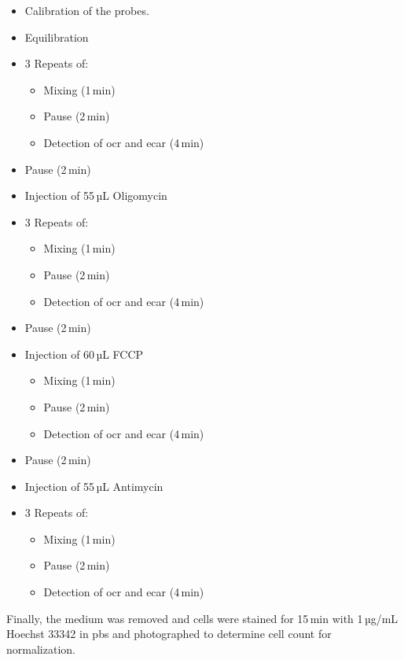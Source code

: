     \begin{itemize}
        \item Calibration of the probes.
        \item Equilibration
        \item 3 Repeats of:
        \begin{itemize}
            \item Mixing (1\,min)
            \item Pause (2\,min)
            \item Detection of \ac{ocr} and \ac{ecar} (4\,min)
        \end{itemize}
        \item Pause (2\,min)
        \item Injection of 55\,µL Oligomycin
        \item 3 Repeats of:
        \begin{itemize}
            \item Mixing (1\,min)
            \item Pause (2\,min)
            \item Detection of \ac{ocr} and \ac{ecar} (4\,min)
        \end{itemize}
        \item Pause (2\,min)
        \item Injection of 60\,µL FCCP
        \begin{itemize}
            \item Mixing (1\,min)
            \item Pause (2\,min)
            \item Detection of \ac{ocr} and \ac{ecar} (4\,min)
        \end{itemize}
        \item Pause (2\,min)
        \item Injection of 55\,µL Antimycin
        \item 3 Repeats of:
        \begin{itemize}
            \item Mixing (1\,min)
            \item Pause (2\,min)
            \item Detection of \ac{ocr} and \ac{ecar} (4\,min)
        \end{itemize}
    \end{itemize}

    Finally, the medium was removed and cells were stained for 15\,min with 1\,µg/mL Hoechst 33342 in \ac{pbs} and photographed to determine cell count for normalization.

